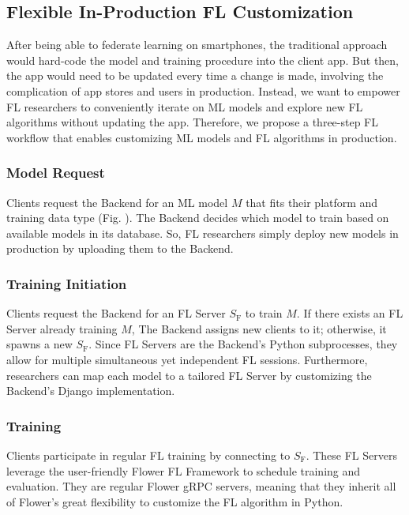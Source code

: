 \documentclass[letterpaper]{article} %
\begin{document}
\subsection{Flexible In-Production FL Customization}
\newcommand{\model}{$M$}
\newcommand{\fs}{$S_\mathrm F$}
After being able to federate learning on smartphones,
the traditional approach would hard-code the model and training procedure
into the client app.
But then, the app would need to be updated every time a change is made,
involving the complication of app stores and users in production.
Instead,
we want to empower FL researchers to conveniently iterate on ML models and
explore new FL algorithms
without updating the app.
Therefore, we propose a three-step FL workflow that
enables customizing ML models and FL algorithms in production.

\subsubsection{Model Request}
Clients request the Backend for an ML model \model{} that fits
their platform and training data type (Fig. ). %
The Backend decides which model to train based on
available models in its database.
So, FL researchers simply deploy new models in production by uploading them to
the Backend.

\subsubsection{Training Initiation}
Clients request the Backend for an FL Server \fs{} to train \model.
If there exists an FL Server already training \model,
The Backend assigns new clients to it;
otherwise, it spawns a new \fs.
Since FL Servers are the Backend's Python subprocesses,
they allow for multiple simultaneous yet independent FL sessions.
Furthermore, researchers can map each model to a tailored FL Server by
customizing the Backend's Django implementation.

\subsubsection{Training}
Clients participate in regular FL training by connecting to \fs.
These FL Servers leverage the user-friendly Flower FL Framework to
schedule training and evaluation.
They are regular Flower gRPC servers, meaning that
they inherit all of Flower's great flexibility to customize the FL algorithm in
Python.
\end{document}
